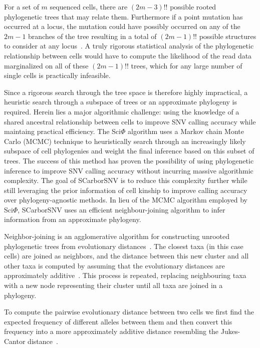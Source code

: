 \documentclass[../../main.tex]{subfiles}
\begin{document}
For a set of $m$ sequenced cells, there are $(2m-3)!!$ possible rooted phylogenetic trees that may relate them.
Furthermore if a point mutation has occurred at a locus, the mutation could have possibly occurred on any of the $2m-1$  branches of the tree resulting in a total of $(2m-1)!!$ possible structures to consider at any locus~\cite{BSA}.
A truly rigorous statistical analysis of the phylogenetic relationship between cells would have to compute the likelihood of the read data marginalized on all of these $(2m-1)!!$ trees, which for any large number of single cells is practically infeasible.

Since a rigorous search through the tree space is therefore highly impractical, a heuristic search through a subspace of trees or an approximate phylogeny is required.
Herein lies a major algorithmic challenge: using the knowledge of a shared ancestral relationship between cells to improve SNV calling accuracy while maintaing practical efficiency.
The Sci$\Phi$ algorithm uses a Markov chain Monte Carlo (MCMC) technique to heuristically search through an increasingly likely subspace of cell phylogenies and weight the final inference based on this subset of trees.
The success of this method has proven the possibility of using phylogenetic inference to improve SNV calling accuracy without incurring massive algorithmic complexity.
The goal of SCarborSNV is to reduce this complexity further while still leveraging the prior information of cell kinship to improve calling accuracy over phylogeny-agnostic methods.
In lieu of the MCMC algorithm employed by Sci$\Phi$, SCarborSNV uses an efficient neighbour-joining algorithm to infer information from an approximate phylogeny.

Neighbor-joining is an agglomerative algorithm for constructing unrooted phylogenetic trees from evolutionary distances~\cite{NJ}.
The closest taxa (in this case cells) are joined as neighbors, and the distance between this new cluster and all other taxa is computed by assuming that the evolutionary distances are approximately additive~\cite{BSA}.
This process is repeated, replacing neighbouring taxa with a new node representing their cluster until all taxa are joined in a phylogeny.

To compute the pairwise evolutionary distance between two cells we first find the expected frequency of different alleles between them and then convert this frequency into a more approximately additive distance resembling the Jukes-Cantor distance~\cite{JC, BSA}.
\end{document}
